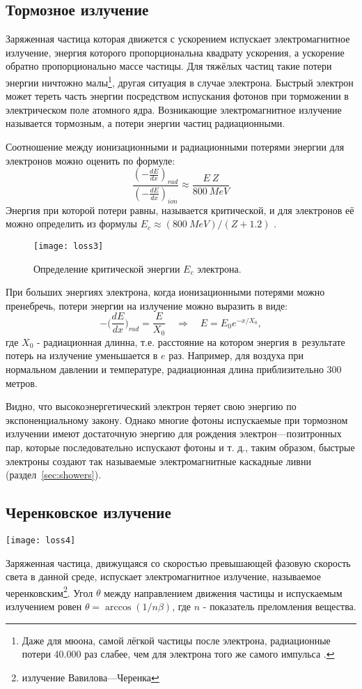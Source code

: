 \subsection{Тормозное излучение}
\label{sec:breaking}
Заряженная частица которая движется с ускорением испускает
электромагнитное излучение, энергия которого пропорциональна квадрату
ускорения, а ускорение обратно пропорционально массе частицы. Для
тяжёлых частиц такие потери энергии ничтожно малы\footnote{Даже для
  мюона, самой лёгкой частицы после электрона, радиационные потери 40.000
  раз слабее, чем для электрона того же самого импульса \cite{kor:06}.},
другая ситуация в случае электрона. Быстрый электрон может тереть часть
энергии посредством испускания фотонов при торможении в электрическом
поле атомного ядра. Возникающие электромагнитное излучение называется
тормозным, а потери энергии частиц радиационными.

Соотношение между ионизационными и радиационными потерями энергии для
электронов можно оценить по формуле:
\[
\frac{(-\frac{dE}{dx})_{rad}}{(-\frac{dE}{dx})_{ion}} \approx \frac{E~Z}{800~MeV}
\]
Энергия при которой потери равны, называется критической, и для электронов
её можно определить из формулы $E_c \approx (800~MeV)/(Z+1.2)$ \cite{sta}.
\begin{figure}[h]\center
  \texttt{[image: loss3]}
  \caption{Определение критической энергии $E_c$ электрона.}
  \label{fig:loss3}
\end{figure}

При больших энергиях электрона, когда ионизационными потерями можно
пренебречь, потери энергии на излучение можно выразить в виде:
\[
-\Bigg(\frac{dE}{dx}\Bigg)_{rad}=\frac{E}{X_0} \quad \Rightarrow \quad
E = E_0e^{-x/X_0},
\]
где $X_0$ - радиационная длинна, т.е. расстояние на котором энергия
в~результате потерь на излучение уменьшается в $e$ раз. Например, для
воздуха при нормальном давлении и температуре, радиационная длина
приблизительно 300 метров.

Видно, что высокоэнергетический электрон теряет свою энергию по
экспоненциальному закону. Однако многие фотоны испускаемые при
тормозном излучении имеют достаточную энергию для рождения
элек\-трон---позитронных пар, которые последовательно испускают фотоны
и т. д., таким образом, быстрые электроны создают так называемые
электромагнитные каскадные ливни (раздел~\ref{sec:showers}).

\subsection{Черенковское излучение}
\begin{floatingfigure}[l]{6.5cm}
  \texttt{[image: loss4]}
\end{floatingfigure}
Заряженная частица, движущаяся со скоростью превышающей фазовую
скорость света в данной среде, испускает электромагнитное излучение,
называемое черенковским\footnote{излучение Вавилова---Черенка}.
Угол $\theta$ между направлением движения частицы и испускаемым
излучением ровен $\theta =\arccos(1/n\beta)$, где $n$ - показатель
преломления вещества.


